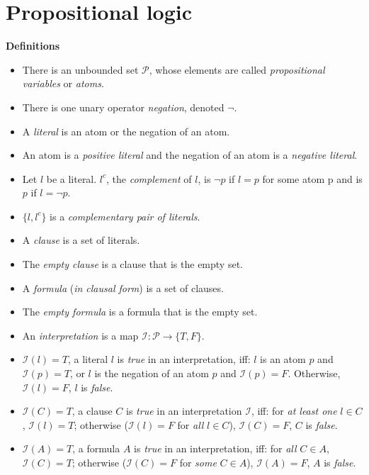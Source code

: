 \documentclass[11pt]{report}
\newcommand*{\ngg}{\mathop{\neg}}
\begin{document}
\chapter{Propositional logic}\label{ch.intro}

\begin{center}
\textbf{Definitions}
\end{center}

\begin{itemize}
\item There is an unbounded set $\mathcal{P}$, whose elements are called
\emph{propositional variables} or \emph{atoms}.
\item There is one unary operator \emph{negation}, denoted $\ngg$.
\item A \emph{literal} is an atom or the negation of an atom.
\item An atom is a \emph{positive literal} and the negation of an atom
is a \emph{negative literal}.
\item Let $l$ be a literal. $l^c$, the \emph{complement} of $l$, is $\ngg p$ if
$l=p$ for some atom p and is $p$ if $l=\ngg p$.
\item $\{l,l^c\}$ is a \emph{complementary pair of literals}.
\item A \emph{clause} is a set of literals.
\item The \emph{empty clause} is a clause that is the empty set.
\item A \emph{formula} (\emph{in clausal form}) is a set of clauses.
\item The \emph{empty formula} is a formula that is the empty set.

\item An \emph{interpretation} is a map $\mathcal{I}: \mathcal{P}
\rightarrow \{T,F\}$.

\item $\mathcal{I}(l)=T$, a literal $l$ is \emph{true} in an
interpretation, iff: $l$ is an atom $p$ and $\mathcal{I}(p)=T$, or $l$ is
the negation of an atom $p$ and $\mathcal{I}(p)=F$.
Otherwise, $\mathcal{I}(l)=F$, $l$ is \emph{false}.

\item $\mathcal{I}(C)=T$, a clause $C$ is \emph{true} in an
interpretation $\mathcal{I}$, iff: for \emph{at least one} $l\in C$,
$\mathcal{I}(l)=T$; otherwise ($\mathcal{I}(l)=F$ for \emph{all}
$l\in C$), $\mathcal{I}(C)=F$, $C$ is \emph{false}.

\item $\mathcal{I}(A)=T$, a formula $A$ is \emph{true} in an
interpretation, iff: for \emph{all} $C\in A$, $\mathcal{I}(C)=T$;
otherwise ($\mathcal{I}(C)=F$ for \emph{some} $C\in A$),
$\mathcal{I}(A)=F$, $A$ is \emph{false}.


\end{itemize}
\end{document}
